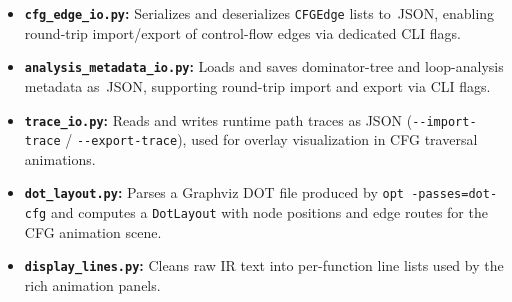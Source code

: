 \begin{itemize}
    \item \textbf{\texttt{cfg\_edge\_io.py}:} Serializes and deserializes \texttt{CFG\-Edge} lists to~JSON, enabling round-trip import/export of control-flow edges via dedicated CLI flags.

    \item \textbf{\texttt{analysis\_metadata\_io.py}:} Loads and saves dominator-tree and loop-analysis metadata as~JSON, supporting round-trip import and export via CLI flags.

    \item \textbf{\texttt{trace\_io.py}:} Reads and writes runtime path traces as JSON (\texttt{-{}-import-trace} / \texttt{-{}-export-trace}), used for overlay visualization in CFG traversal animations.

    \item \textbf{\texttt{dot\_layout.py}:} Parses a Graphviz DOT file produced by \texttt{opt -passes=dot-cfg} and computes a \texttt{Dot\-Layout} with node positions and edge routes for the CFG animation scene.

    \item \textbf{\texttt{display\_lines.py}:} Cleans raw IR text into per-function line lists used by the rich animation panels.
\end{itemize}
